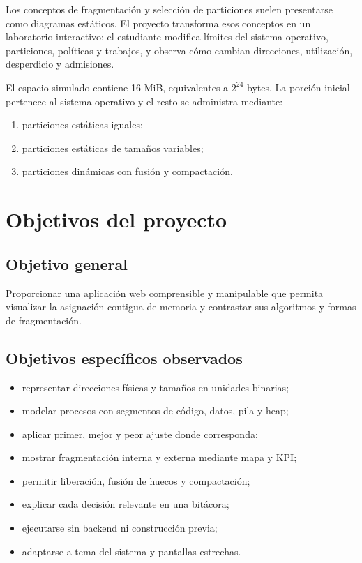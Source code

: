 \documentclass[11pt,a4paper]{article}
\begin{document}
Los conceptos de fragmentación y selección de particiones suelen presentarse como
diagramas estáticos. El proyecto transforma esos conceptos en un laboratorio
interactivo: el estudiante modifica límites del sistema operativo, particiones,
políticas y trabajos, y observa cómo cambian direcciones, utilización, desperdicio
y admisiones.

El espacio simulado contiene 16 MiB, equivalentes a \(2^{24}\) bytes. La porción
inicial pertenece al sistema operativo y el resto se administra mediante:

\begin{enumerate}
  \item particiones estáticas iguales;
  \item particiones estáticas de tamaños variables;
  \item particiones dinámicas con fusión y compactación.
\end{enumerate}

\section{Objetivos del proyecto}

\subsection{Objetivo general}

Proporcionar una aplicación web comprensible y manipulable que permita visualizar
la asignación contigua de memoria y contrastar sus algoritmos y formas de
fragmentación.

\subsection{Objetivos específicos observados}

\begin{itemize}
  \item representar direcciones físicas y tamaños en unidades binarias;
  \item modelar procesos con segmentos de código, datos, pila y heap;
  \item aplicar primer, mejor y peor ajuste donde corresponda;
  \item mostrar fragmentación interna y externa mediante mapa y KPI;
  \item permitir liberación, fusión de huecos y compactación;
  \item explicar cada decisión relevante en una bitácora;
  \item ejecutarse sin backend ni construcción previa;
  \item adaptarse a tema del sistema y pantallas estrechas.
\end{itemize}
\end{document}
